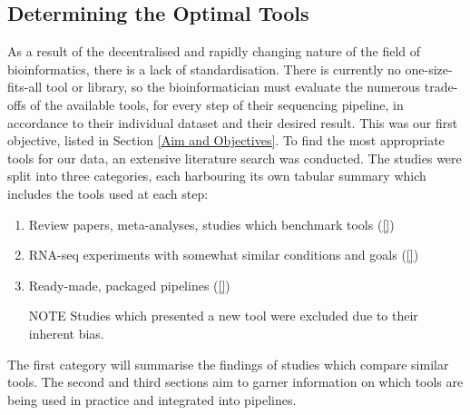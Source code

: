 
\subsection{Determining the Optimal Tools}
As a result of the decentralised and rapidly changing nature of the field of bioinformatics, there is a lack of standardisation. There is currently no one-size-fits-all tool or library, so the bioinformatician must evaluate the numerous trade-offs of the available tools, for every step of their sequencing pipeline, in accordance to their individual dataset and their desired result. This was our first objective, listed in Section \ref{Aim and Objectives}. To find the most appropriate tools for our data, an extensive literature search was conducted. The studies were split into three categories, each harbouring its own tabular summary which includes the tools used at each step:

\begin{enumerate}
\item Review papers, meta-analyses, studies which benchmark tools (\autoref{})
\item RNA-seq experiments with somewhat similar conditions and goals (\autoref{})
\item Ready-made, packaged pipelines (\autoref{})
\item[NOTE] Studies which presented a new tool were excluded due to their inherent bias.
\end{enumerate}

The first category will summarise the findings of studies which compare similar tools. The second and third sections aim to garner information on which tools are being used in practice and integrated into pipelines.


